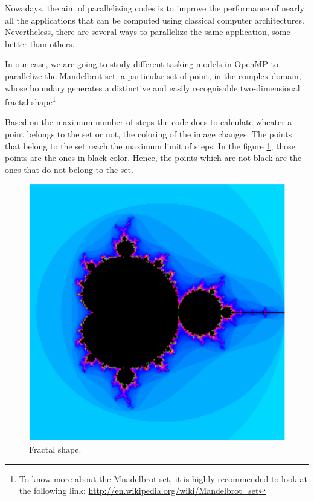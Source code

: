 \documentclass[12pt, a4paper]{article}
\begin{document}
Nowadays, the aim of parallelizing codes is to improve the performance of nearly all the applications that can be computed using classical computer architectures. Nevertheless, there are several ways to parallelize the same application, some better than others.

In our case, we are going to study different tasking models in OpenMP to parallelize the Mandelbrot set, a particular set of point, in the complex domain, whose boundary generates a distinctive and easily recognisable two-dimensional fractal shape\footnote{To know more about the Mnadelbrot set, it is highly recommended to look at the following link: \url{http://en.wikipedia.org/wiki/Mandelbrot\_set}}.

Based on the maximum number of steps the code does to calculate wheater a point belongs to the set or not, the coloring of the image changes. The points that belong to the set reach the maximum limit of steps. In the figure \ref{mandelbrot}, those points are the ones in black color. Hence, the points which are not black are the ones that do not belong to the set.

\begin{figure}[H]
	\centering
	\includegraphics[scale=0.7]{./mandelbrotset}
	\caption{Fractal shape.}
	\label{mandelbrot}
\end{figure}
\end{document}
